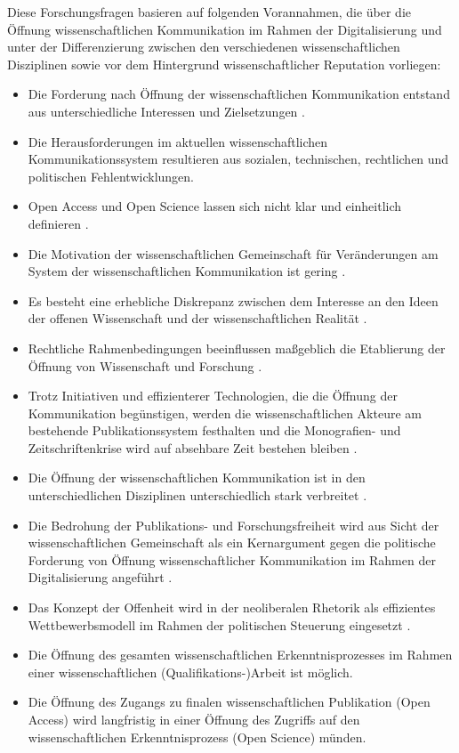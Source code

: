 Diese Forschungsfragen basieren auf folgenden Vorannahmen, die über die Öffnung wissenschaftlichen Kommunikation im Rahmen der Digitalisierung und unter der Differenzierung zwischen den verschiedenen wissenschaftlichen Disziplinen sowie vor dem Hintergrund wissenschaftlicher Reputation vorliegen:
\begin{itemize}
\item Die Forderung nach Öffnung der wissenschaftlichen Kommunikation entstand aus unterschiedliche Interessen und Zielsetzungen \cite{suchen-Hoffmann-Zugang-undVerwertung-oeffentlicher-Informationen}.
\item Die Herausforderungen im aktuellen wissenschaftlichen Kommunikationssystem resultieren aus sozialen, technischen, rechtlichen und politischen Fehlentwicklungen.
\item Open Access und Open Science lassen sich nicht klar und einheitlich definieren \cite{naeder_2010_open}.
\item Die Motivation der wissenschaftlichen Gemeinschaft für Veränderungen am System der wissenschaftlichen Kommunikation ist gering \cite{hagner_2015_sache_buches}.
\item Es besteht eine erhebliche Diskrepanz zwischen dem Interesse an den Ideen der offenen Wissenschaft und der wissenschaftlichen Realität \cite{Scheliga_2014}.
\item Rechtliche Rahmenbedingungen beeinflussen maßgeblich die Etablierung der Öffnung von Wissenschaft und Forschung \cite[:211]{Fehling_2014}.
\item Trotz Initiativen und effizienterer Technologien, die die Öffnung der Kommunikation begünstigen, werden die wissenschaftlichen Akteure am bestehende Publikationssystem festhalten und die Monografien- und Zeitschriftenkrise wird auf absehbare Zeit bestehen bleiben \cite{Parks_2002_acadamic_faust} \cite{Goetting_2015}.
\item Die Öffnung der wissenschaftlichen Kommunikation ist in den unterschiedlichen Disziplinen unterschiedlich stark verbreitet \cite{EuropeanCommission_sciencepub_2006}.
\item Die Bedrohung der Publikations- und Forschungsfreiheit wird aus Sicht der wissenschaftlichen Gemeinschaft als ein Kernargument gegen die politische Forderung von Öffnung wissenschaftlicher Kommunikation im Rahmen der Digitalisierung angeführt \cite{siehe_unten}.
\item Das Konzept der Offenheit wird in der neoliberalen Rhetorik als effizientes Wettbewerbsmodell im Rahmen der  politischen Steuerung eingesetzt \cite{tkacz_2012_open}.
\item Die Öffnung des gesamten wissenschaftlichen Erkenntnisprozesses im Rahmen einer wissenschaftlichen (Qualifikations-)Arbeit ist möglich.
\item Die Öffnung des Zugangs zu finalen wissenschaftlichen Publikation (Open Access) wird langfristig in einer Öffnung des Zugriffs auf den wissenschaftlichen Erkenntnisprozess (Open Science) münden.
\end{itemize}

